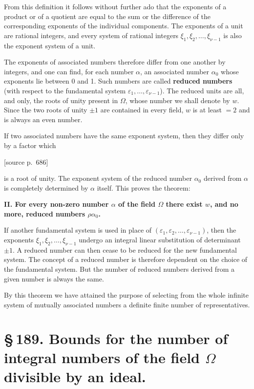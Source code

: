 \documentclass[11pt]{article}
\newcommand{\srcpage}[1]{\par\medskip\noindent\textsf{[source p.~#1]}\par\smallskip}
\begin{document}
From this definition it follows without further ado that the exponents of a product or of a quotient are equal to the sum or the difference of the corresponding exponents of the individual components. The exponents of a unit are rational integers, and every system of rational integers $\xi_1,\xi_2,\ldots,\xi_{\nu-1}$ is also the exponent system of a unit.

The exponents of associated numbers therefore differ from one another by integers, and one can find, for each number $\alpha$, an associated number $\alpha_0$ whose exponents lie between 0 and 1. Such numbers are called \textbf{reduced numbers} (with respect to the fundamental system $\varepsilon_1,\ldots,\varepsilon_{\nu-1}$). The reduced units are all, and only, the roots of unity present in $\Omega$, whose number we shall denote by $w$. Since the two roots of unity $\pm1$ are contained in every field, $w$ is at least $=2$ and is always an even number.

If two associated numbers have the same exponent system, then they differ only by a factor which

\srcpage{686}
is a root of unity. The exponent system of the reduced number $\alpha_0$ derived from $\alpha$ is completely determined by $\alpha$ itself. This proves the theorem:

\begin{center}
\textbf{II. For every non-zero number $\alpha$ of the field $\Omega$ there exist $w$, and no more, reduced numbers $\rho\alpha_0$.}
\end{center}

If another fundamental system is used in place of $(\varepsilon_1,\varepsilon_2,\ldots,\varepsilon_{\nu-1})$, then the exponents $\xi_1,\xi_2,\ldots,\xi_{\nu-1}$ undergo an integral linear substitution of determinant $\pm1$. A reduced number can then cease to be reduced for the new fundamental system. The concept of a reduced number is therefore dependent on the choice of the fundamental system. But the number of reduced numbers derived from a given number is always the same.

By this theorem we have attained the purpose of selecting from the whole infinite system of mutually associated numbers a definite finite number of representatives.

\section*{\S\,189. Bounds for the number of integral numbers of the field $\Omega$ divisible by an ideal.}
\end{document}
